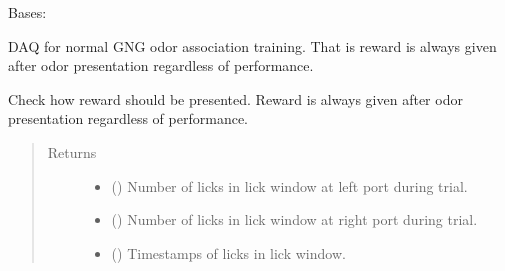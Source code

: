 \documentclass[letterpaper,10pt,english]{sphinxmanual}
\begin{document}
\begin{fulllineitems}
\label{\detokenize{NoSeMazeControl/daqface:daqface.DAQ.DoAiMultiTaskOdourTraining}}
\pysigstartsignatures
{}
\pysigstopsignatures
\sphinxAtStartPar
Bases: 

\sphinxAtStartPar
DAQ for normal GNG odor association training. That is reward is always given after
odor presentation regardless of performance.

\begin{fulllineitems}
\label{\detokenize{NoSeMazeControl/daqface:daqface.DAQ.DoAiMultiTaskOdourTraining.CheckLicks}}
\pysigstartsignatures
{}
\pysigstopsignatures
\sphinxAtStartPar
Check how reward should be presented. Reward is always given after
odor presentation regardless of performance.
\begin{quote}\begin{description}
\item[{Returns}] \leavevmode
\sphinxAtStartPar
\begin{itemize}
\item {} 
\sphinxAtStartPar
{} () \textendash{} Number of licks in lick window at left port during trial.

\item {} 
\sphinxAtStartPar
{} () \textendash{} Number of licks in lick window at right port during trial.

\item {} 
\sphinxAtStartPar
{} () \textendash{} Timestamps of licks in lick window.


\end{itemize}
\end{description}
\end{quote}
\end{fulllineitems}
\end{fulllineitems}
\end{document}
